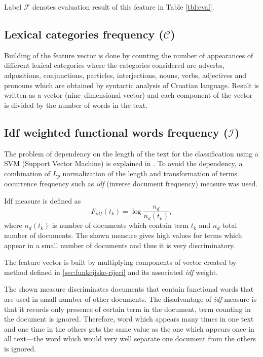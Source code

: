 \documentclass[11pt,english]{article}
\begin{document}
\begin{multicols}{2}
Label $\mathcal{F}$ denotes evaluation result of this feature in Table
\ref{tbl:eval}.

\subsection{Lexical categories frequency ($\mathcal{C}$)}
\label{sec:rijeci-grupe}
Building of the feature vector is done by counting the number of appearances of
different lexical categories where the categories considered are adverbs,
adpositions, conjunctions, particles, interjections, nouns, verbs, adjectives and
pronouns which are obtained by syntactic analysis of Croatian language. Result is
written as a vector (nine--dimensional vector) and each component of the vector
is divided by the number of words in the text.

\subsection{Idf weighted functional words frequency ($\mathcal{I}$)}
\label{sec:funkcijske-rijeci-idf}
The problem of dependency on the length of the text for the classification using
a SVM (Support Vector Machine) is explained in \citep{diederich2003authorship}.
To avoid the dependency, a combination of $L_p$ normalization of the
length and transformation of terms occurrence frequency such as \emph{idf}
(inverse document frequency) measure was used.

Idf measure is defined as \citep{diederich2003authorship}
\begin{equation}
F_{idf}(t_k) = \log \frac{n_d}{n_d(t_k)},
\label{equ:idf}
\end{equation}
where $n_d(t_k)$ is number of documents which contain term $t_k$ and
$n_d$ total number of documents. The shown measure gives high values for terms
which appear in a small number of documents and thus it is very discriminatory.

The feature vector is built by multiplying components of vector created by method
defined in \ref{sec:funkcijske-rijeci} and its associated \emph{idf} weight.

The shown measure discriminates documents that contain functional words that are
used in small number of other documents. The disadvantage of \emph{idf} measure is
that it records only presence of certain term in the document, term
counting in the document is ignored. Therefore, word which appears many times in
one text and one time in the others gets the same value as the one which appears
once in all text---the word which would very well separate one document from the
others is ignored.


\end{multicols}
\end{document}
